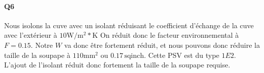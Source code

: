 \paragraph{Q6}
Nous isolons la cuve avec un isolant réduisant le coefficient d'échange de la cuve avec l'extérieur à 
$10 \si{\watt}/\si{\meter\squared}*\si{\kelvin}$
On réduit donc le facteur environnemental à $F = 0.15$. 
Notre $W$ va donc être fortement réduit, et nous pouvons donc réduire la taille de la soupape à 
$110\si{\milli\meter\squared}$ ou $0.17 \, \text{sqinch}$. Cette PSV est du type $1E2$. L'ajout de l'isolant réduit donc fortement la taille de
la soupape requise.
